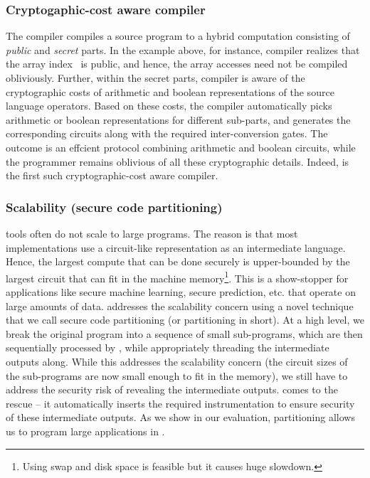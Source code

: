 \subsubsection*{Cryptogaphic-cost aware compiler} The \tool compiler
compiles a source program to a hybrid computation consisting
of \emph{public} and \emph{secret} parts. In the example above, for
instance, \tool compiler realizes that the array index~ is
public, and hence, the array accesses need not be compiled
obliviously. Further, within the secret parts, \tool compiler is
aware
of the cryptographic costs of arithmetic and boolean representations
of the source language operators. Based on these costs, the compiler
automatically picks arithmetic or boolean
representations for different sub-parts, and generates the
corresponding circuits along with the required inter-conversion
gates. The outcome is an effcient \mpc protocol combining arithmetic
and boolean circuits, while the programmer remains
oblivious of all these cryptographic details. Indeed, \tool is the
first such cryptographic-cost aware compiler.

\subsubsection*{Scalability (secure code partitioning)} \mpc tools
often do not scale to large programs. The reason is that
most \mpc implementations use a circuit-like representation as an
intermediate language. Hence, the largest compute that can be done
securely is upper-bounded by the largest circuit that can fit in the
machine memory\footnote{Using swap and
disk space is feasible but it causes huge slowdown.}. This is a
show-stopper for applications like secure machine learning, secure
prediction, etc. that operate on large amounts of data.
\tool addresses the scalability concern using a novel technique that
we call secure code partitioning (or partitioning in short). At
a high level, we break the original program into a sequence of small
sub-programs, which are then sequentially processed by \tool, while
appropriately threading the intermediate outputs
along. While this
addresses the scalability concern (the circuit
sizes of the sub-programs are now small enough to fit in the memory),
we still have to address
the security risk of revealing the intermediate outputs. \tool comes
to the rescue -- it automatically inserts the required instrumentation
to ensure security of these intermediate outputs. As
we show in our
evaluation, partitioning allows us to program large applications
in \tool.

